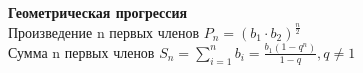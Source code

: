 \textbf{Геометрическая прогрессия} \\
Произведение n первых членов $P_n = (b_1 \cdot b_2)^{\frac{n}{2}}$ \\
Сумма n первых членов $S_n = \sum_{i=1}^{n}b_i = \frac{b_1(1-q^n)}{1-q}, q \ne 1$